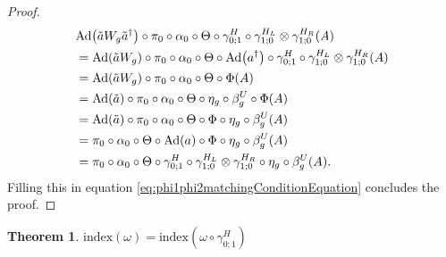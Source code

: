 \documentclass[12pt,a4paper,twoside]{article}
\let\originalleft\left
\let\originalright\right
\renewcommand{\left}{\mathopen{}\mathclose\bgroup\originalleft}
\renewcommand{\right}{\aftergroup\egroup\originalright}
\newcommand{\Ad}[1]{\textrm{Ad}\left(#1\right)}
\theoremstyle{definition}
\newtheorem{theorem}{Theorem}[section]
\numberwithin{equation}{section}
\begin{document}
\begin{proof}
	\begin{align}
		&\Ad{\tilde{a}W_g\tilde{a}^\dagger}\circ\pi_0\circ\alpha_0\circ\Theta\circ \gamma^{H}_{0;1}\circ\gamma^{H_L}_{1;0}\otimes\gamma^{H_R}_{1;0}(A)\\
		&=\Ad{\tilde{a}W_g}\circ\pi_0\circ\alpha_0\circ\Theta\circ\Ad{a^\dagger}\circ \gamma^{H}_{0;1}\circ\gamma^{H_L}_{1;0}\otimes\gamma^{H_R}_{1;0}(A)\\
		&=\Ad{\tilde{a}W_g}\circ\pi_0\circ\alpha_0\circ\Theta\circ\Phi(A)\\
		&=\Ad{\tilde{a}}\circ\pi_0\circ\alpha_0\circ\Theta\circ\eta_g\circ\beta_g^U\circ\Phi(A)\\
		&=\Ad{\tilde{a}}\circ\pi_0\circ\alpha_0\circ\Theta\circ\Phi\circ\eta_g\circ\beta_g^U(A)\\
		&=\pi_0\circ\alpha_0\circ\Theta\circ\Ad{a}\circ\Phi\circ\eta_g\circ\beta_g^U(A)\\
		&=\pi_0\circ\alpha_0\circ\Theta\circ \gamma^{H}_{0;1}\circ\gamma^{H_L}_{1;0}\otimes\gamma^{H_R}_{1;0} \circ\eta_g\circ\beta_g^U(A).
	\end{align}
	Filling this in equation \eqref{eq:phi1phi2matchingConditionEquation} concludes the proof.
\end{proof}
\begin{theorem}\label{thrm:IndexInvariantUnderLGA}
	$\textrm{index}(\omega)=\textrm{index}(\omega\circ\gamma^H_{0;1})$
\end{theorem}
\end{document}
